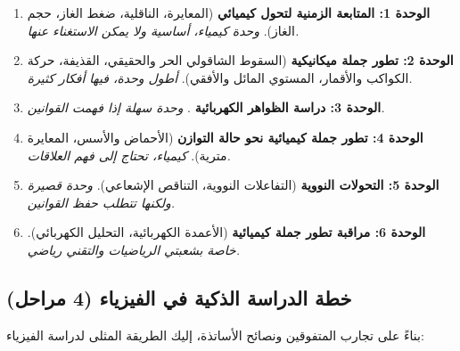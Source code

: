 \documentclass[12pt,a4paper]{book}
\begin{document}
	\begin{enumerate}
		\item \textbf{الوحدة 1: المتابعة الزمنية لتحول كيميائي} (المعايرة، الناقلية، ضغط الغاز، حجم الغاز). \textit{وحدة كيمياء، أساسية ولا يمكن الاستغناء عنها.}
		\item \textbf{الوحدة 2: تطور جملة ميكانيكية} (السقوط الشاقولي الحر والحقيقي، القذيفة، حركة الكواكب والأقمار، المستوي المائل والأفقي). \textit{أطول وحدة، فيها أفكار كثيرة.}
		\item \textbf{الوحدة 3: دراسة الظواهر الكهربائية} . \textit{وحدة سهلة إذا فهمت القوانين.}
		\item \textbf{الوحدة 4: تطور جملة كيميائية نحو حالة التوازن} (الأحماض والأسس، المعايرة  مترية). \textit{كيمياء، تحتاج إلى فهم العلاقات.}
		\item \textbf{الوحدة 5: التحولات النووية} (التفاعلات النووية، التناقص الإشعاعي). \textit{وحدة قصيرة ولكنها تتطلب حفظ القوانين.}
		\item \textbf{الوحدة 6: مراقبة تطور جملة كيميائية} (الأعمدة الكهربائية، التحليل الكهربائي). \textit{خاصة بشعبتي الرياضيات والتقني رياضي.}
	\end{enumerate}
	
	\subsection{خطة الدراسة الذكية في الفيزياء (4 مراحل)}
	بناءً على تجارب المتفوقين ونصائح الأساتذة، إليك الطريقة المثلى لدراسة الفيزياء:
	
\end{document}
